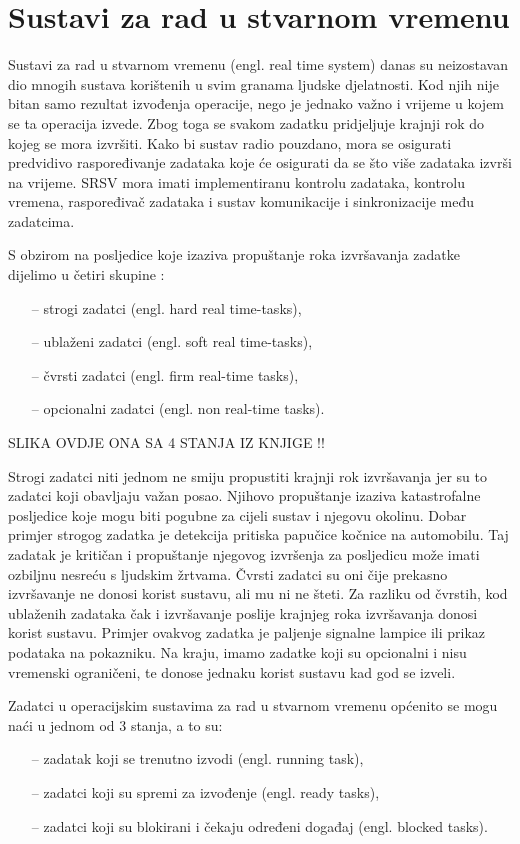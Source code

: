 \documentclass[../zavrsni.tex]{subfiles}
\begin{document}
\section{Sustavi za rad u stvarnom vremenu}

Sustavi za rad u stvarnom vremenu (engl. real time system) danas su neizostavan dio mnogih sustava korištenih u svim
granama ljudske djelatnosti. Kod njih nije bitan samo rezultat izvođenja operacije, nego je jednako važno 
i vrijeme u kojem se ta operacija izvede. Zbog toga se svakom zadatku pridjeljuje krajnji rok do kojeg se mora izvršiti. 
Kako bi sustav radio pouzdano, mora se osigurati predvidivo raspoređivanje zadataka koje će osigurati da se što više 
zadataka izvrši na vrijeme.
SRSV mora imati implementiranu kontrolu zadataka, kontrolu vremena, raspoređivač zadataka i sustav komunikacije i sinkronizacije
među zadatcima.

S obzirom na posljedice koje izaziva propuštanje roka izvršavanja zadatke dijelimo u četiri skupine :
\begin{itemize}
    \item[--] strogi zadatci (engl. hard real time-tasks),
    \item[--] ublaženi zadatci (engl. soft real time-tasks),
    \item[--] čvrsti zadatci (engl. firm real-time tasks),
    \item[--] opcionalni zadatci (engl. non real-time tasks).
\end{itemize}

SLIKA OVDJE ONA SA 4 STANJA IZ KNJIGE !!

Strogi zadatci niti jednom ne smiju propustiti krajnji rok izvršavanja jer su to zadatci koji obavljaju važan posao. Njihovo 
propuštanje izaziva katastrofalne posljedice koje mogu biti pogubne za cijeli sustav i njegovu okolinu. Dobar primjer strogog zadatka je detekcija 
pritiska papučice kočnice na automobilu. Taj zadatak je kritičan i propuštanje njegovog izvršenja za posljedicu može imati ozbiljnu
nesreću s ljudskim žrtvama. Čvrsti zadatci su oni čije prekasno izvršavanje ne donosi korist sustavu, ali mu ni ne šteti.
Za razliku od čvrstih, kod ublaženih zadataka čak i izvršavanje poslije krajnjeg roka izvršavanja donosi korist sustavu.
Primjer ovakvog zadatka je paljenje signalne lampice ili prikaz podataka na pokazniku.
Na kraju, imamo zadatke koji su opcionalni i nisu vremenski ograničeni, te donose jednaku korist sustavu kad god se izveli.

Zadatci u operacijskim sustavima za rad u stvarnom vremenu općenito se mogu naći u jednom od 3 stanja, a to su:
\begin{itemize}
    \item[--] zadatak koji se trenutno izvodi (engl. running task),
    \item[--] zadatci koji su spremi za izvođenje (engl. ready tasks),
    \item[--] zadatci koji su blokirani i čekaju određeni događaj (engl. blocked tasks).
\end{itemize}
\end{document}
